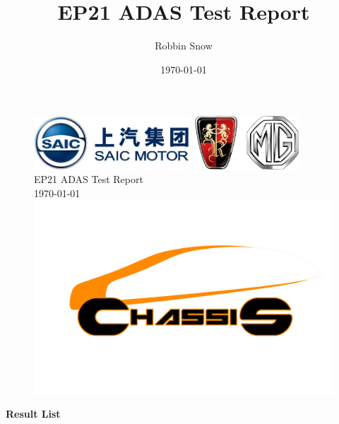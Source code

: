 \documentclass[12pt]{report}
\title{EP21 ADAS Test Report}
\author{Robbin Snow}
\date{\today}
\begin{document}
 
\begin{titlepage} 
\begin{figure}[h] 
\includegraphics[height=2cm]{SAICLogo}\hfill 
\includegraphics[height=2cm]{RMGLogo}\\ 
\vskip 3cm 
\centering\Huge{EP21 ADAS Test Report}\\ 
\vskip 0.5cm 
\centering\Huge{\today} 
\vskip 4cm 
\includegraphics[width=0.55\linewidth]{CHLogo} 
\end{figure} 
\end{titlepage} 
\centerline{\Large{\textbf{Result List}}} 
\end{document}
